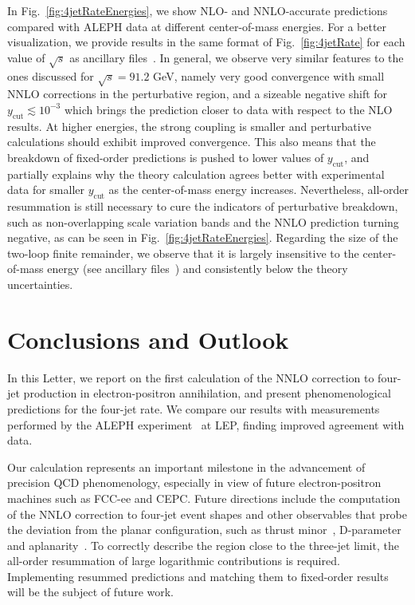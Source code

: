 \documentclass[10pt,aps,prl,superscriptaddress,twocolumn,preprintnumbers,nofootinbib]{revtex4-2}
\newcommand{\ycut}{y_{\mathrm{cut}}}
\begin{document}
In Fig.~\ref{fig:4jetRateEnergies}, we show NLO- and NNLO-accurate predictions compared with ALEPH data at different center-of-mass energies. For a better visualization, we provide results in the same format of Fig.~\ref{fig:4jetRate} for each value of $\sqrt{s}$ as ancillary files~\cite{zenodo}. In general, we observe very similar features to the ones discussed for $\sqrt{s}=91.2$ GeV, namely  very good convergence with small NNLO corrections in the perturbative region, and a sizeable negative shift for $\ycut\lesssim10^{-3}$ which brings the prediction closer to data with respect to the NLO results. At higher energies, the strong coupling is smaller and perturbative calculations should exhibit improved convergence. This also means that the breakdown of fixed-order predictions is pushed to lower values of $\ycut$, and partially explains why the theory calculation agrees better with experimental data for smaller $\ycut$ as the center-of-mass energy increases. Nevertheless, all-order resummation is still necessary to cure the indicators of perturbative breakdown, such as non-overlapping scale variation bands and the NNLO prediction turning negative, as can be seen in Fig.~\ref{fig:4jetRateEnergies}. Regarding the size of the two-loop finite remainder, we observe that it is largely insensitive to the center-of-mass energy (see ancillary files~\cite{zenodo}) and consistently below the theory uncertainties.


\section{Conclusions and Outlook}

In this Letter, we report on the first calculation of the NNLO correction to four-jet production in electron-positron annihilation, and present phenomenological predictions for the four-jet rate. We compare our results with measurements performed by the ALEPH experiment~\cite{ALEPH:2003obs} at LEP, finding improved agreement with data.

Our calculation represents an important milestone in the advancement of precision QCD phenomenology, especially in view of future electron-positron machines such as FCC-ee and CEPC.
Future directions include the computation of the  NNLO correction to four-jet event shapes and other observables that probe the deviation from the planar configuration, such as thrust minor~\cite{MARK-J:1980tvz}, D-parameter~\cite{Ellis:1980wv} and aplanarity~\cite{PLUTO:1978jrw}. To correctly describe the region close to the three-jet limit, the all-order resummation of large logarithmic contributions is required. Implementing resummed predictions and matching them to fixed-order results will be the subject of future work.
\end{document}

